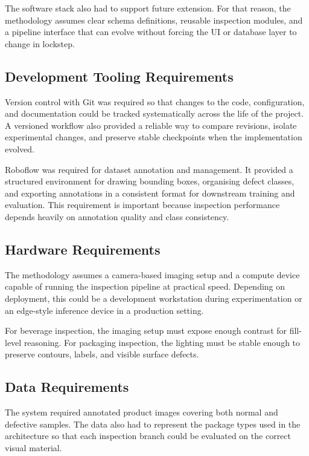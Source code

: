 \documentclass[12pt,a4paper]{report}
\begin{document}
The software stack also had to support future extension. For that reason, the methodology assumes clear schema definitions, reusable inspection modules, and a pipeline interface that can evolve without forcing the UI or database layer to change in lockstep.

\subsection{Development Tooling Requirements}
\label{subsec:development-tooling-requirements}

Version control with Git was required so that changes to the code, configuration, and documentation could be tracked systematically across the life of the project. A versioned workflow also provided a reliable way to compare revisions, isolate experimental changes, and preserve stable checkpoints when the implementation evolved.

Roboflow was required for dataset annotation and management. It provided a structured environment for drawing bounding boxes, organising defect classes, and exporting annotations in a consistent format for downstream training and evaluation. This requirement is important because inspection performance depends heavily on annotation quality and class consistency.

\subsection{Hardware Requirements}
\label{subsec:hardware-requirements}

The methodology assumes a camera-based imaging setup and a compute device capable of running the inspection pipeline at practical speed. Depending on deployment, this could be a development workstation during experimentation or an edge-style inference device in a production setting.

For beverage inspection, the imaging setup must expose enough contrast for fill-level reasoning. For packaging inspection, the lighting must be stable enough to preserve contours, labels, and visible surface defects.

\subsection{Data Requirements}
\label{subsec:data-requirements}

The system required annotated product images covering both normal and defective samples. The data also had to represent the package types used in the architecture so that each inspection branch could be evaluated on the correct visual material.
\end{document}
